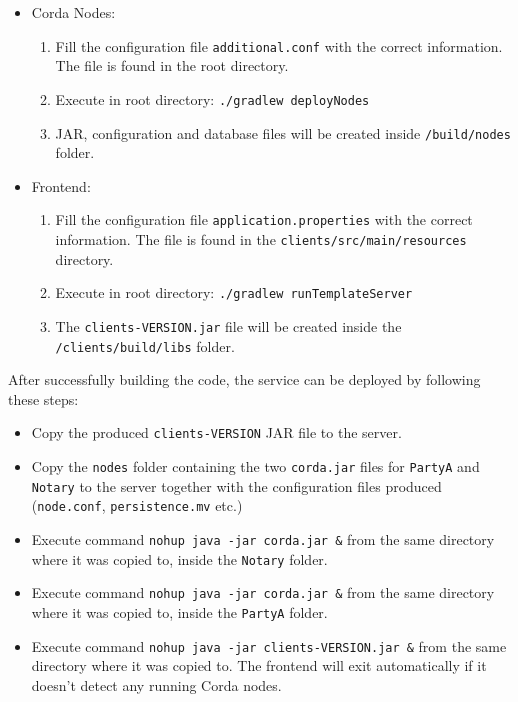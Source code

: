 \begin{itemize}
	\item Corda Nodes:
	\begin{enumerate}
		\item Fill the configuration file \texttt{additional.conf} with the correct information. The file is found in the root directory.
		\item Execute in root directory: \texttt{./gradlew deployNodes}
		\item JAR, configuration and database files will be created inside \texttt{/build/nodes} folder.
	\end{enumerate}
	\item Frontend:
	\begin{enumerate}
		\item Fill the configuration file \texttt{application.properties} with the correct information. The file is found in the \texttt{clients/src/main/resources} directory.
		\item Execute in root directory: \texttt{./gradlew runTemplateServer}
		\item The \texttt{clients-VERSION.jar} file will be created inside the \texttt{/clients/build/libs} folder. 
	\end{enumerate}
\end{itemize}

After successfully building the code, the service can be deployed by following these steps:

\begin{itemize}
	\item Copy the produced \texttt{clients-VERSION} JAR file to the server.
	\item Copy the \texttt{nodes} folder containing the two \texttt{corda.jar} files for \texttt{PartyA} and \texttt{Notary} to the server together with the configuration files produced (\texttt{node.conf}, \texttt{persistence.mv} etc.) 
	\item Execute command \texttt{nohup java -jar corda.jar \&} from the same directory where it was copied to, inside the \texttt{Notary} folder.
	\item Execute command \texttt{nohup java -jar corda.jar \&} from the same directory where it was copied to, inside the \texttt{PartyA} folder.
	\item Execute command \texttt{nohup java -jar clients-VERSION.jar \&} from the same directory where it was copied to. The frontend will exit automatically if it doesn't detect any running Corda nodes.
\end{itemize}


